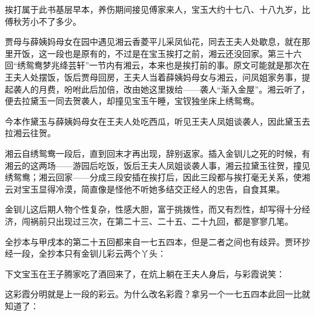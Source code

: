 \par 挨打属于此书基层早本，养伤期间接见傅家来人，宝玉大约十七八、十八九岁，比傅秋芳小不了多少。
\par 贾母与薛姨妈母女在园中遇见湘云香菱平儿采凤仙花，同去王夫人处歇息，就在那里开饭，这一段也是原有的，不过是在宝玉挨打之前，湘云还没回家。第三十六回“绣鸳鸯梦兆绛芸轩”一节内有湘云，本来也是挨打前的事。原文可能就是那次在王夫人处摆饭，饭后贾母回房，王夫人当着薛姨妈母女与湘云，问凤姐家务事，提起袭人的月费，吩咐此后加倍，改由她这里拨给——袭人“渐入金屋”。湘云听了，便去拉黛玉一同去贺袭人，却撞见宝玉午睡，宝钗独坐床上绣鸳鸯。
\par 今本作黛玉与薛姨妈母女在王夫人处吃西瓜，听见王夫人凤姐谈袭人，因此黛玉去拉湘云往贺。
\par 湘云自绣鸳鸯一段后，直到回末才再出现，辞别返家。插入金钏儿之死的时候，有湘云的这两场——游园后吃饭，饭后王夫人凤姐谈袭人事，湘云拉黛玉往贺，撞见绣鸳鸯；湘云回家——分成三段安插在挨打后，因此三段都与挨打毫无关系，使湘云对宝玉显得冷漠，简直像是怪他不听她多结交正经人的忠告，自食其果。
\par 金钏儿这后期人物个性复杂，性感大胆，富于挑拨性，而又有烈性，却写得十分经济，闯祸前只出现过三次，在第二十三、二十五、二十九回，都是寥寥几笔。
\par 全抄本与甲戌本的第二十五回都来自一七五四本，但是二者之间也有歧异。贾环抄经一段，全抄本只有金钏儿彩云两个丫头：
\par 下文宝玉在王子腾家吃了酒回来了，在炕上躺在王夫人身后，与彩霞说笑：
\par 这彩霞分明就是上一段的彩云。为什么改名彩霞？拿另一个一七五四本此回一比就知道了：
